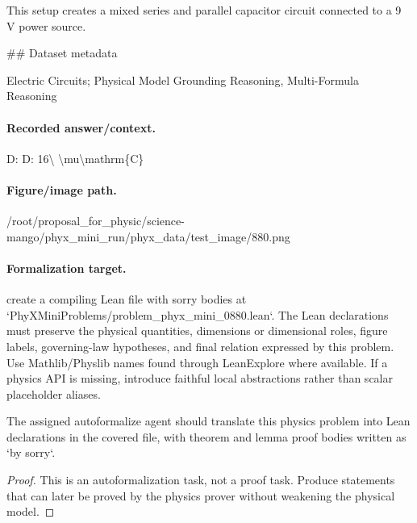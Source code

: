 This setup creates a mixed series and parallel capacitor circuit connected to a 9 V power source.

\#\# Dataset metadata

Electric Circuits; Physical Model Grounding Reasoning, Multi-Formula Reasoning

\paragraph{Recorded answer/context.}
D: D: 16\textbackslash{} \textbackslash{}mu\textbackslash{}mathrm\{C\}

\paragraph{Figure/image path.}
/root/proposal\_for\_physic/science-mango/phyx\_mini\_run/phyx\_data/test\_image/880.png

\paragraph{Formalization target.}
create a compiling Lean file with sorry bodies at `PhyXMiniProblems/problem\_phyx\_mini\_0880.lean`. The Lean declarations must preserve the physical quantities, dimensions or dimensional roles, figure labels, governing-law hypotheses, and final relation expressed by this problem.
Use Mathlib/Physlib names found through LeanExplore where available. If a physics API is missing, introduce faithful local abstractions rather than scalar placeholder aliases.

\begin{theorem}
\label{thm:physics:phyx_mini_0880:target}
The assigned autoformalize agent should translate this physics problem into Lean declarations in the covered file, with theorem and lemma proof bodies written as `by sorry`.
\end{theorem}
\begin{proof}
This is an autoformalization task, not a proof task. Produce statements that can later be proved by the physics prover without weakening the physical model.
\end{proof}

